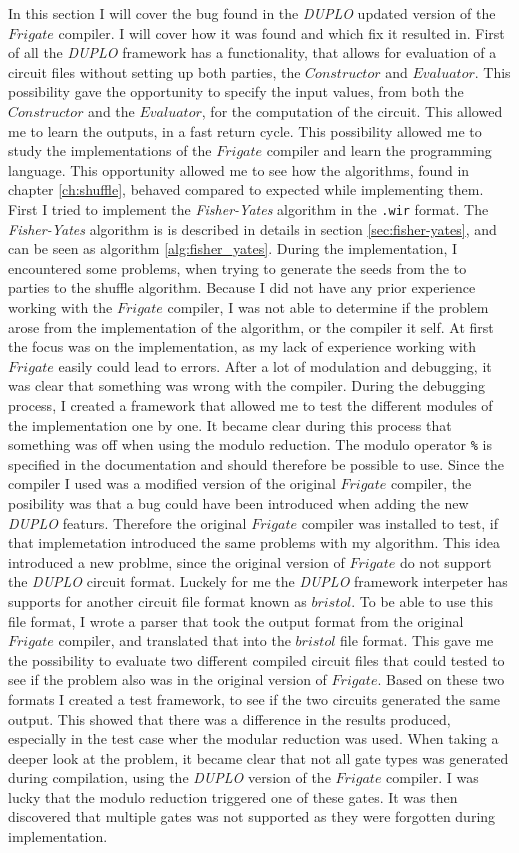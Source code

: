\documentclass[twoside,11pt,openright]{report}
\newcommand{\FY}{\textit{Fisher-Yates} }
\newcommand{\DUPLO}{\textit{DUPLO} }
\begin{document}
In this section I will cover the bug found in the \DUPLO updated version of the $Frigate$ compiler. I will cover how it was found and which fix it resulted in. First of all the \DUPLO framework has a functionality, that allows for evaluation of a circuit files without setting up both parties, the $Constructor$ and $Evaluator$. This possibility gave the opportunity to specify the input values, from both the $Constructor$ and the $Evaluator$, for the computation of the circuit. This allowed me to learn the outputs, in a fast return cycle. This possibility allowed me to study the implementations of the $Frigate$ compiler and learn the programming language. This opportunity allowed me to see how the algorithms, found in chapter \ref{ch:shuffle}, behaved compared to expected while implementing them. First I tried to implement the \FY algorithm in the \verb|.wir| format. The \FY algorithm is is described in details in section \ref{sec:fisher-yates}, and can be seen as algorithm \ref{alg:fisher_yates}. During the implementation, I encountered some problems, when trying to generate the seeds from the to parties to the shuffle algorithm. Because I did not have any prior experience working with the $Frigate$ compiler, I was not able to determine if the problem arose from the implementation of the algorithm, or the compiler it self. At first the focus was on the implementation, as my lack of experience working with $Frigate$ easily could lead to errors. After a lot of modulation and debugging, it was clear that something was wrong with the compiler. During the debugging process, I created a framework that allowed me to test the different modules of the implementation one by one. It became clear during this process that something was off when using the modulo reduction. The modulo operator \verb|%| is specified in the documentation and should therefore be possible to use. Since the compiler I used was a modified version of the original $Frigate$ compiler, the posibility was that a bug could have been introduced when adding the new \DUPLO featurs. Therefore the original $Frigate$ compiler was installed to test, if that implemetation introduced the same problems with my algorithm. This idea introduced a new problme, since the original version of $Frigate$ do not support the \DUPLO circuit format. Luckely for me the \DUPLO framework interpeter has supports for another circuit file format known as $bristol$. To be able to use this file format, I wrote a parser that took the output format from the original $Frigate$ compiler, and translated that into the $bristol$ file format. This gave me the possibility to evaluate two different compiled circuit files that could tested to see if the problem also was in the original version of $Frigate$. Based on these two formats I created a test framework, to see if the two circuits generated the same output. This showed that there was a difference in the results produced, especially in the test case wher the modular reduction was used. When taking a deeper look at the problem, it became clear that not all gate types was generated during compilation, using the \DUPLO version of the $Frigate$ compiler. I was lucky that the modulo reduction triggered one of these gates. It was then discovered that multiple gates was not supported as they were forgotten during implementation.
\end{document}

